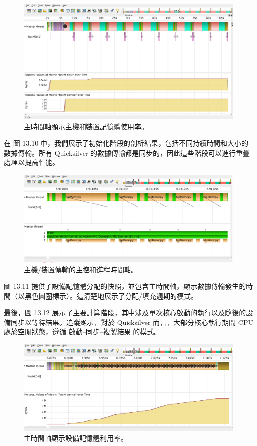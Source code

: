 \begin{figure}
    \centering
    \includegraphics[width=0.9\linewidth]{FileAusiliari/Screenshots/Figure13-9.png}
    \caption{主時間軸顯示主機和裝置記憶體使用率。}
    \label{fig:PAPI9}
\end{figure}


在 圖 13.10 中，我們展示了初始化階段的剖析結果，包括不同持續時間和大小的數據傳輸。所有 Quicksilver 的數據傳輸都是同步的，因此這些階段可以進行重疊處理以提高性能。
\begin{figure}
    \centering
    \includegraphics[width=0.9\linewidth]{FileAusiliari/Screenshots/Figure13-10.png}
    \caption{主機/裝置傳輸的主控和進程時間軸。}
    \label{fig:PAPI10}
\end{figure}

圖 13.11 提供了設備記憶體分配的快照，並包含主時間軸，顯示數據傳輸發生的時間（以黑色圓圈標示）。這清楚地展示了分配/填充週期的模式。

最後，圖 13.12 展示了主要計算階段，其中涉及單次核心啟動的執行以及隨後的設備同步以等待結果。追蹤顯示，對於 Quicksilver 而言，大部分核心執行期間 CPU 處於空閒狀態，遵循 啟動–同步–複製結果 的模式。

\begin{figure}
    \centering
    \includegraphics[width=0.9\linewidth]{FileAusiliari/Screenshots/Figure13-11.png}
    \caption{主時間軸顯示設備記憶體利用率。}
    \label{fig:PAPI11}
\end{figure}

